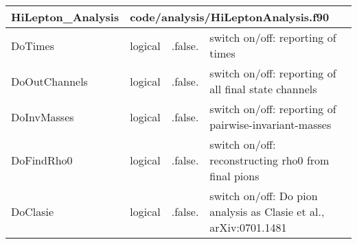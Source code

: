 \documentclass{article}
\begin{document}
\begin{longtable}{llll}
\toprule
\textbf{\large{HiLepton\_Analysis}} & \multicolumn{3}{l}{\footnotesize{code/analysis/HiLeptonAnalysis.f90}}\\*
\midrule
\endfirsthead
\midrule
\endhead
DoTimes & \begin{minipage}[t]{2cm}logical\end{minipage} & \begin{minipage}[t]{2cm}.false.\end{minipage} & \begin{minipage}[t]{12cm}switch on/off: reporting of times\end{minipage}\\*
\midrule
DoOutChannels & \begin{minipage}[t]{2cm}logical\end{minipage} & \begin{minipage}[t]{2cm}.false.\end{minipage} & \begin{minipage}[t]{12cm}switch on/off: reporting of all final state channels\end{minipage}\\*
\midrule
DoInvMasses & \begin{minipage}[t]{2cm}logical\end{minipage} & \begin{minipage}[t]{2cm}.false.\end{minipage} & \begin{minipage}[t]{12cm}switch on/off: reporting of pairwise-invariant-masses\end{minipage}\\*
\midrule
DoFindRho0 & \begin{minipage}[t]{2cm}logical\end{minipage} & \begin{minipage}[t]{2cm}.false.\end{minipage} & \begin{minipage}[t]{12cm}switch on/off: reconstructing rho0 from final pions\end{minipage}\\*
\midrule
DoClasie & \begin{minipage}[t]{2cm}logical\end{minipage} & \begin{minipage}[t]{2cm}.false.\end{minipage} & \begin{minipage}[t]{12cm}switch on/off: Do pion analysis as Clasie et al., arXiv:0701.1481\end{minipage}\\*

\end{longtable}
\end{document}
